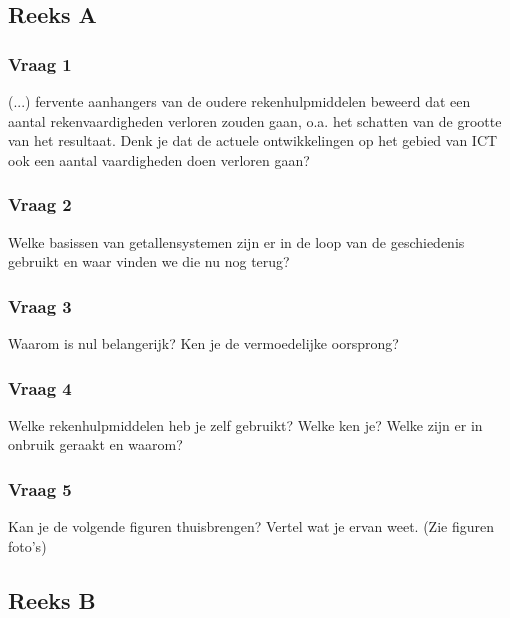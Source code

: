 \documentclass[../main.tex]{subfiles}
\begin{document}
\subsection{Reeks A}

\subsubsection{Vraag 1}
\begin{question}(...) fervente aanhangers van de oudere rekenhulpmiddelen beweerd dat een aantal rekenvaardigheden verloren zouden gaan, o.a. het schatten van de grootte van het resultaat. Denk je dat de actuele ontwikkelingen op het gebied van ICT ook een aantal vaardigheden doen verloren gaan?
\end{question}

\subsubsection{Vraag 2}
\begin{question}
Welke basissen van getallensystemen zijn er in de loop van de geschiedenis gebruikt en waar vinden we die nu nog terug?
\end{question}

\subsubsection{Vraag 3}
\begin{question}
Waarom is nul belangerijk? Ken je de vermoedelijke oorsprong?
\end{question}

\subsubsection{Vraag 4}
\begin{question}
Welke rekenhulpmiddelen heb je zelf gebruikt? Welke ken je? Welke zijn er in onbruik geraakt en waarom?
\end{question}

\subsubsection{Vraag 5}
\begin{question}
Kan je de volgende figuren thuisbrengen? Vertel wat je ervan weet. (Zie figuren foto’s)
\end{question}

\subsection{Reeks B}
\end{document}
